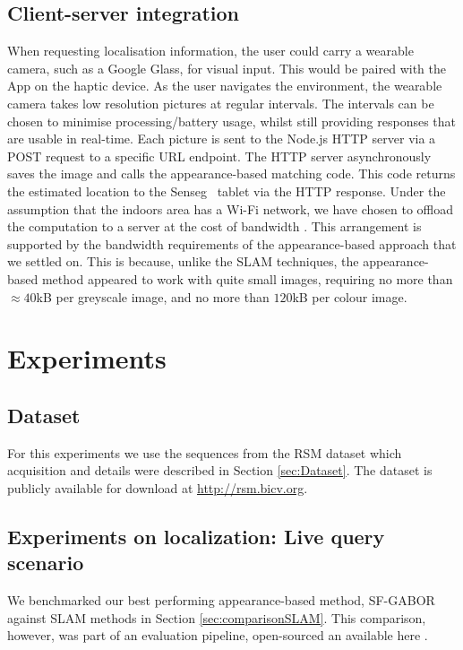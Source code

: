 \subsection{Client-server integration}
\label{sec:5}
When requesting localisation information, the user could carry a wearable camera, such as a Google Glass, for visual input. This would be paired with the App on the haptic device. As the user navigates the environment, the wearable camera takes low resolution pictures at regular  intervals. The intervals can be chosen to minimise processing/battery usage, whilst still providing responses that are usable in real-time. Each picture is sent to the Node.js HTTP server via a POST request to a specific URL endpoint. The HTTP server asynchronously saves the image and calls the appearance-based matching code. This code returns the estimated location to the Senseg\texttrademark~ tablet via the HTTP response. Under the assumption that the indoors area has a Wi-Fi network, we have chosen to offload the computation to a server at the cost of bandwidth \citep{simske2013meta}. This arrangement is supported by the bandwidth requirements of the appearance-based approach that we settled on. This is because, unlike the SLAM techniques, the appearance-based method appeared to work with quite small images, requiring no more than $\approx 40$kB per greyscale image, and no more than $120$kB per colour image.


\section{Experiments}
\label{sec:experiments}

\subsection{Dataset}
For this experiments we use the sequences from the RSM dataset which acquisition and details were described in Section \ref{sec:Dataset}. The dataset is publicly available for download at \url{http://rsm.bicv.org}.


\subsection{Experiments on localization: Live query scenario}

We benchmarked our best performing appearance-based method, SF-GABOR against SLAM methods in Section \ref{sec:comparisonSLAM}. This comparison, however, was part of an evaluation pipeline, open-sourced an available here \cite{RiveraLocEvalCode}.

